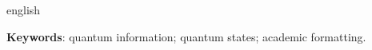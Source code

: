 \begin{resumo}[ABSTRACT]
\begin{otherlanguage*}{english}

\vspace{\onelineskip}
\noindent\textbf{Keywords}: quantum information; quantum states; academic formatting.
\end{otherlanguage*}
\end{resumo}
